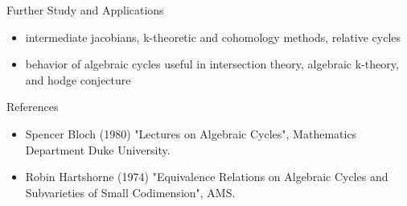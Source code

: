 \begin{frame}{Further Study and Applications}
  \begin{itemize}
    \item intermediate jacobians, k-theoretic and cohomology methods, relative cycles \pause
    \item behavior of algebraic cycles useful in intersection theory, algebraic k-theory, and hodge conjecture
  \end{itemize}
\end{frame}

\begin{frame}{References}
  \begin{itemize}
    \item Spencer Bloch (1980) "Lectures on Algebraic Cycles", Mathematics Department Duke University.
    \item Robin Hartshorne (1974) "Equivalence Relations on Algebraic Cycles and Subvarieties of Small Codimension", 
      AMS.
  \end{itemize}
\end{frame}





